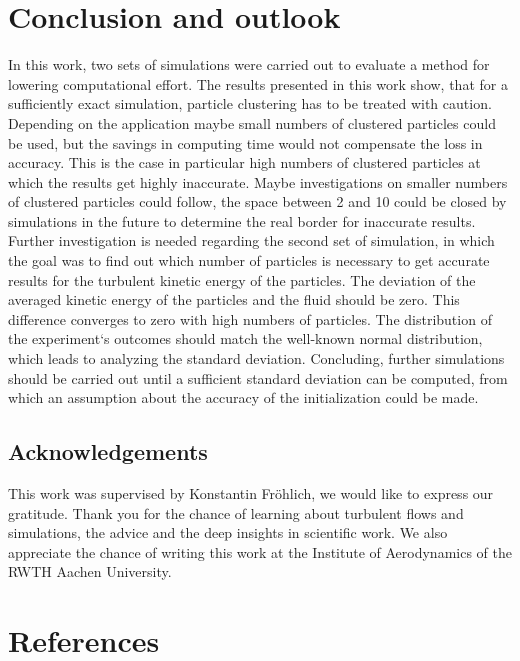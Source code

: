 \documentclass[11pt,a4paper,openany,oneside,parskip=half*]{article}
\begin{document}
\section{Conclusion and outlook}
In this work, two sets of simulations were carried out to evaluate a method for lowering computational effort. 
\newline
The results presented in this work show, that for a sufficiently exact simulation, particle clustering has to be treated with caution. Depending on the application maybe small numbers of clustered particles could be used, but the savings in computing time would not compensate the loss in accuracy. This is the case in particular high numbers of clustered particles at which the results get highly inaccurate. Maybe investigations on smaller numbers of clustered particles could follow, the space between 2 and 10 could be closed by simulations in the future to determine the real border for inaccurate results. 
\newline
Further investigation is needed regarding the second set of simulation, in which the goal was to find out which number of particles is necessary to get accurate results for the turbulent kinetic energy of the particles. The deviation of the averaged kinetic energy of the particles and the fluid should be zero. This difference converges to zero with high numbers of particles. The distribution of the experiment`s outcomes should match the well-known normal distribution, which leads to analyzing the standard deviation. Concluding, further simulations should be carried out until a sufficient standard deviation can be computed, from which an assumption about the accuracy of the initialization could be made.
\subsection*{Acknowledgements}
This work was supervised by Konstantin Fr\"ohlich, we would like to express our gratitude. Thank you for the chance of learning about turbulent flows and simulations, the advice and the deep insights in scientific work. We also appreciate the chance of writing this work at the Institute of Aerodynamics of the RWTH Aachen University.
\pagebreak
\section{References}
\nocite{*} %
\pagebreak
\end{document}
